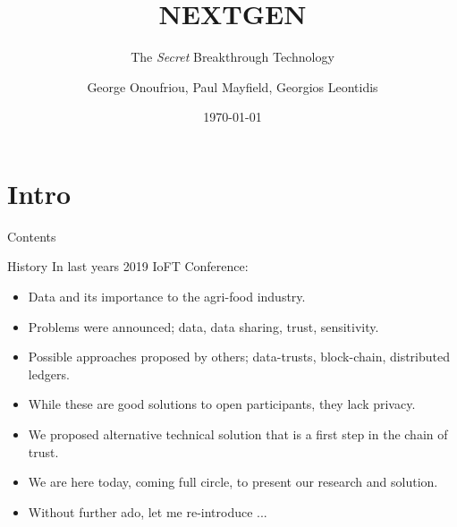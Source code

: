 \documentclass[aspectratio=169]{beamer}
\title{NEXTGEN}
\subtitle{The \textit{Secret} Breakthrough Technology}
\author{George Onoufriou, Paul Mayfield, Georgios Leontidis}
\date{\today}
\begin{document}

  \frame{\titlepage}

  \section{Intro}

    \begin{frame}{Contents}
      \tableofcontents
    \end{frame}

    \begin{frame}{History}
      In last years 2019 IoFT Conference:
      \begin{itemize}
        \item Data and its importance to the agri-food industry.
        \item Problems were announced; data, data sharing, trust, sensitivity.
        \item Possible approaches proposed by others; data-trusts, block-chain, distributed ledgers.
        \item While these are good solutions to open participants, they lack privacy.
        \item We proposed alternative technical solution that is a first step in the chain of trust.
        \item We are here today, coming full circle, to present our research and solution.
        \item Without further ado, let me re-introduce ...
      \end{itemize}
    \end{frame}
\end{document}
